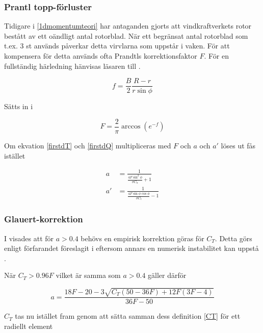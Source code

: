 \subsubsection{Prantl topp-förluster}

Tidigare i \ref{1dmomentumteori} har antaganden gjorts att vindkraftverkets rotor bestått av ett oändligt antal rotorblad. När ett begränsat antal rotorblad som t.ex. 3 st används påverkar detta virvlarna som uppstår i vaken. För att kompensera för detta används ofta Prandtls korrektionsfaktor $F$. För en fullständig härledning hänvisas läsaren till \citet{glauert}.

\begin{equation}
\label{F} f = \frac{B}{2} \frac{R-r}{r \sin \phi}
\end{equation}

Sätts in i

\begin{equation}
\label{F} F = \frac{2}{\pi} \arccos (e^{-f}) 
\end{equation}

Om ekvation \ref{firstdT} och \ref{firstdQ} multipliceras med $F$ och $a$ och $a'$ löses ut fås istället

\begin{equations}
\begin{align}
   \label{aFkorrad} a &= \frac{1}{\frac{4 F \sin^2 \phi}{\sigma C_n} + 1} \\
   \label{aprimkorrad} a' &= \frac{1}{\frac{4 F \sin \phi \cos \phi}{\sigma C_t} - 1}
\end{align}
\end{equations}

\subsubsection{Glauert-korrektion}

I  visades att för $a > 0.4$ behövs en empirisk korrektion göras för $C_T$. Detta görs enligt förfarandet föreslagit i \citet{buhl} eftersom annars en numerisk instabilitet kan uppstå \citep{adyntheory}.

När $C_T > 0.96F$ vilket är samma som $a > 0.4$ gäller därför 

\begin{equation}
\label{aKorr} a = \frac{18F-20-3\sqrt{C_T(50-36F) + 12F(3F-4)}}{36F-50}
\end{equation}

$C_T$ tas nu istället fram genom att sätta samman dess definition \ref{CT} för ett radiellt element 

